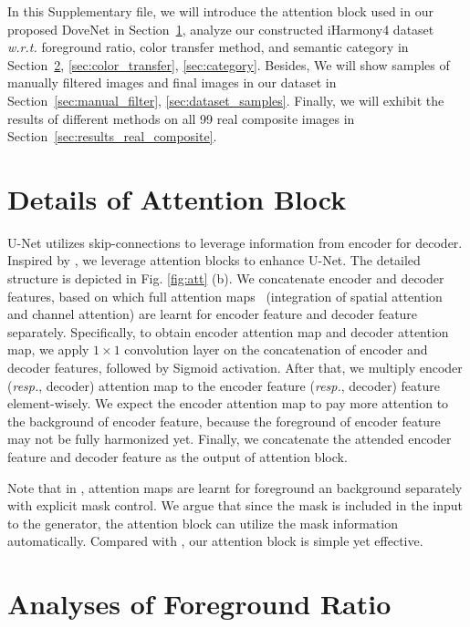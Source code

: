 \documentclass[10pt,twocolumn,letterpaper]{article}
\begin{document}
In this Supplementary file, we will introduce the attention block used in our proposed DoveNet in Section~\ref{sec:attention}, analyze our constructed iHarmony4 dataset \emph{w.r.t.} foreground ratio, color transfer method, and semantic category in Section~\ref{sec:foreground_ratio}, \ref{sec:color_transfer}, \ref{sec:category}. Besides, We will show samples of manually filtered images and final images in our dataset in Section~\ref{sec:manual_filter}, \ref{sec:dataset_samples}. Finally, we will exhibit the results of different methods on all 99 real composite images in Section~\ref{sec:results_real_composite}.



\section{Details of Attention Block}\label{sec:attention}
U-Net utilizes skip-connections to leverage information from encoder for decoder. Inspired by \cite{xiaodong2019improvingsupp}, we leverage attention blocks to enhance U-Net.
 The detailed structure is depicted in Fig. \ref{fig:att} (b). We concatenate encoder and decoder features, based on which full attention maps~\cite{yu2019freesupp} (integration of spatial attention and channel attention) are learnt for encoder feature and decoder feature separately. Specifically, to obtain encoder attention map and decoder attention map, we apply $1\times 1$ convolution layer on the concatenation of encoder and decoder features, followed by Sigmoid activation. After that, we multiply encoder (\emph{resp.}, decoder) attention map to the encoder feature (\emph{resp.}, decoder) feature element-wisely. We expect the encoder attention map to pay more attention to the background of encoder feature, because the foreground of encoder feature may not be fully harmonized yet.
 Finally, we concatenate the attended encoder feature and decoder feature as the output of attention block.
 
Note that in \cite{xiaodong2019improvingsupp}, attention maps are learnt for foreground an background separately with explicit mask control. We argue that since the mask is included in the input to the generator, the attention block can utilize the mask information automatically. Compared with \cite{xiaodong2019improvingsupp}, our attention block is simple yet effective.


\section{Analyses of Foreground Ratio}\label{sec:foreground_ratio}
\end{document}
